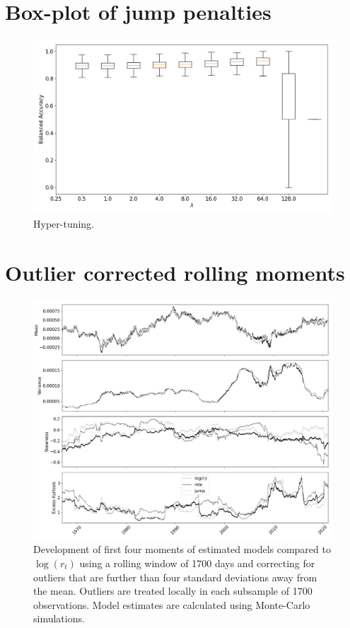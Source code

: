 \section{Box-plot of jump penalties}
\label{appendix:box_plot}

\begin{figure}[H] 
    \centering
    \includegraphics[width=1\textwidth]{analysis/model_convergence/images/jump_penalties_box.png}
    \caption{Hyper-tuning.}
\end{figure}


\section{Outlier corrected rolling moments}

\begin{figure}[H] 
    \centering
    \includegraphics[width=1.0\textwidth]{analysis/stylized_facts/images/moments_outlier_corrected.png}
    \caption{Development of first four moments of estimated models compared to $\log(r_t)$ using a rolling window of 1700 days and correcting for outliers that are further than four standard deviations away from the mean. Outliers are treated locally in each subsample of 1700 observations. Model estimates are calculated using Monte-Carlo simulations.}
\end{figure}
\label{fig:stylized_facts_rolling_moments_outliers_appendix}



